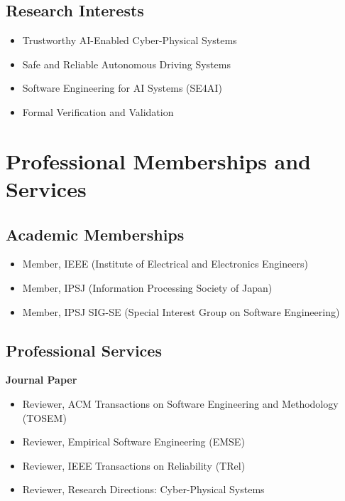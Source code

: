 \documentclass[11pt,a4paper]{moderncv}        %
\newcommand{\subsubsection}[1]{%
  \par\vspace{0.5em}%
  {\color{color1}\bfseries #1}%
  \par\vspace{0.25em}%
}
\begin{document}
\subsection{Research Interests}
\begin{itemize}
  \item Trustworthy AI-Enabled Cyber-Physical Systems
  \item Safe and Reliable Autonomous Driving Systems
  \item Software Engineering for AI Systems (SE4AI)
  \item Formal Verification and Validation
\end{itemize}

\section{Professional Memberships and Services}

\subsection{Academic Memberships}
\begin{itemize}
  \item Member, IEEE (Institute of Electrical and Electronics Engineers) \hfill  
  \item Member, IPSJ (Information Processing Society of Japan)
  \item Member, IPSJ SIG-SE (Special Interest Group on Software Engineering)
\end{itemize}

\subsection{Professional Services}

\subsubsection{Journal Paper}

\begin{itemize}
    \item Reviewer, ACM Transactions on Software Engineering and Methodology (TOSEM)
    \item Reviewer, Empirical Software Engineering (EMSE)
    \item Reviewer, IEEE Transactions on Reliability (TRel)
    \item Reviewer, Research Directions: Cyber-Physical Systems
\end{itemize}
\end{document}
